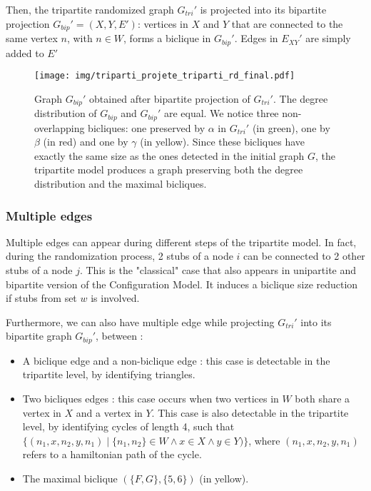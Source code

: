 \documentclass[table]{report}
\begin{document}
Then, the tripartite randomized graph ${G_{tri}}'$ is projected into its bipartite projection ${G_{bip}}'=(X,Y,E')$: vertices in $X$ and $Y$ that are connected to the same vertex $n$, with $n \in W$, forms a biclique in ${G_{bip}}'$. Edges in ${E_{XY}}'$ are simply added to $E'$

\begin{figure}[h]%
\centering
\texttt{[image: img/triparti\_projete\_triparti\_rd\_final.pdf]}
\caption{Graph ${G_{bip}}'$ obtained after bipartite projection of ${G_{tri}}'$. The degree distribution of ${G_{bip}}$ and ${G_{bip}}'$ are equal. We notice three non-overlapping bicliques: one preserved by $\alpha$ in ${G_{tri}}'$ (in green), one by $\beta$ (in red) and one by $\gamma$ (in yellow). Since these bicliques have exactly the same size as the ones detected in the initial graph $G$, the tripartite model produces a graph preserving both the degree distribution and the maximal bicliques.}
\label{fig:graphs}
\end{figure}
\FloatBarrier

\subsubsection{Multiple edges}

Multiple edges can appear during different steps of the tripartite model. In fact, during the randomization process, 2 stubs of a node $i$ can be connected to 2 other stubs of a node $j$. This is the "classical" case that also appears in unipartite and bipartite version of the Configuration Model. It induces a biclique size reduction if stubs from set $w$ is involved. 

Furthermore, we can also have multiple edge while projecting ${G_{tri}}'$ into its bipartite graph ${G_{bip}}'$, between :

\begin{itemize}[noitemsep]
    \item A biclique edge and a non-biclique edge : this case is detectable in the tripartite level, by identifying triangles.
    \item Two bicliques edges : this case occurs when two vertices in $W$ both share a vertex in $X$ and a vertex in $Y$. This case is also detectable in the tripartite level, by identifying cycles of length 4, such that $\{(n_1,x,n_2,y,n_1) \mid \{n_1,n_2\} \in W \wedge x \in X \wedge y \in Y)\}$, where $(n_1,x,n_2,y,n_1)$ refers to a hamiltonian path of the cycle.
    \item The maximal biclique $(\{F,G\}, \{5,6\})$ (in yellow).
\end{itemize}  
\end{document}
